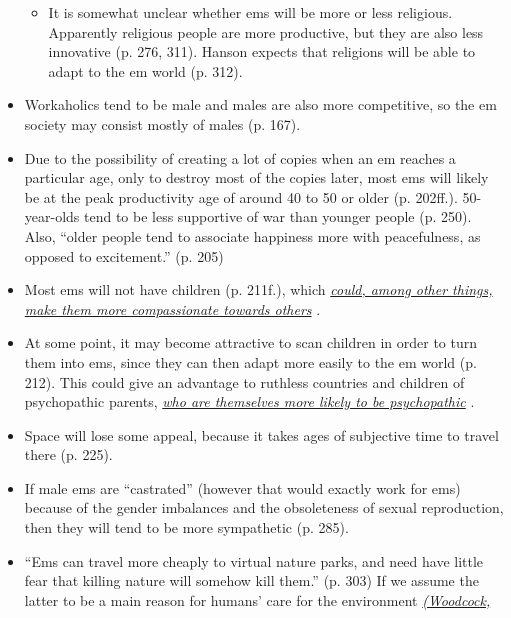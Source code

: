 \documentclass[]{article}
\begin{document}
\begin{itemize}
  \begin{itemize}
  \item
    It is somewhat unclear whether ems will be more or less religious.
    Apparently religious people are more productive, but they are also
    less innovative (p. 276, 311). Hanson expects that religions will be
    able to adapt to the em world (p. 312).
  \end{itemize}
\item
  Workaholics tend to be male and males are also more competitive, so
  the em society may consist mostly of males (p. 167).
\item
  Due to the possibility of creating a lot of copies when an em reaches
  a particular age, only to destroy most of the copies later, most ems
  will likely be at the peak productivity age of around 40 to 50 or
  older (p. 202ff.). 50-year-olds tend to be less supportive of war than
  younger people (p. 250). Also, ``older people tend to associate
  happiness more with peacefulness, as opposed to excitement.'' (p. 205)
\item
  Most ems will not have children (p. 211f.), which
  \href{http://www.theatlantic.com/health/archive/2015/11/having-kids-can-make-parents-less-empathetic/416592/}{\emph{could,
  among other things, make them more compassionate towards others}}
  \parencite{Gilead2014-rv}.
\item
  At some point, it may become attractive to scan children in order to
  turn them into ems, since they can then adapt more easily to the em
  world (p. 212). This could give an advantage to ruthless countries and
  children of psychopathic parents,
  \href{http://aftermath-surviving-psychopathy.org/index.php/is-psychopathy-genetic/}{\emph{who
  are themselves more likely to be psychopathic}}
  \parencite{Viding2010-my,Waldman2006-ka,Farrington2006-az}.
\item
  Space will lose some appeal, because it takes ages of subjective time
  to travel there (p. 225).
\item
  If male ems are ``castrated'' (however that would exactly work for
  ems) because of the gender imbalances and the obsoleteness of sexual
  reproduction, then they will tend to be more sympathetic (p. 285).
\item
  ``Ems can travel more cheaply to virtual nature parks, and need have
  little fear that killing nature will somehow kill them.'' (p. 303) If
  we assume the latter to be a main reason for humans' care for the
  environment
  \href{http://www.collectionscanada.gc.ca/obj/s4/f2/dsk3/ftp04/NQ59050.pdf\#page=165}{\emph{(Woodcock,
}}
\end{itemize}
\end{document}
